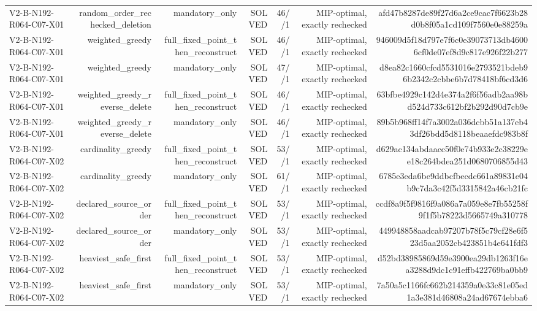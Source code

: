 {\begin{longtable}{lrrrrrr}
V2-B-N192-R064-C07-X01 & random\_order\_rechecked\_deletion & mandatory\_only & SOLVED & 46//1 & MIP-optimal, exactly rechecked & afd47b8287de89f27d6a2ce9cac7f6623b28d0b8f05a1cd109f7560e0e88259a \\
V2-B-N192-R064-C07-X01 & weighted\_greedy & full\_fixed\_point\_then\_reconstruct & SOLVED & 46//1 & MIP-optimal, exactly rechecked & 946009d5f18d797e7f6c0e39073713db46006cf0de07ef8d9c817e926f22b277 \\
V2-B-N192-R064-C07-X01 & weighted\_greedy & mandatory\_only & SOLVED & 47//1 & MIP-optimal, exactly rechecked & d8ea82c1660cfcd5531016e2793521bdeb96b2342c2cbbe6b7d78418bf6cd3d6 \\
V2-B-N192-R064-C07-X01 & weighted\_greedy\_reverse\_delete & full\_fixed\_point\_then\_reconstruct & SOLVED & 46//1 & MIP-optimal, exactly rechecked & 63bfbe4929c142d4e374a2f6f56adb2aa98bd524d733c612bf2b292d90d7cb9e \\
V2-B-N192-R064-C07-X01 & weighted\_greedy\_reverse\_delete & mandatory\_only & SOLVED & 46//1 & MIP-optimal, exactly rechecked & 89b5b968ff14f7a3002a036dcbb51a137eb43df26bdd5d8118beaaefdc983b8f \\
V2-B-N192-R064-C07-X02 & cardinality\_greedy & full\_fixed\_point\_then\_reconstruct & SOLVED & 53//1 & MIP-optimal, exactly rechecked & d629ac134abdaacc50f0e74b933e2c38229ee18c264bdea251d0680706855d43 \\
V2-B-N192-R064-C07-X02 & cardinality\_greedy & mandatory\_only & SOLVED & 61//1 & MIP-optimal, exactly rechecked & 6785e3eda6be9ddbcfbecdc661a89831e04b9c7da3c42f5d3315842a46cb21fc \\
V2-B-N192-R064-C07-X02 & declared\_source\_order & full\_fixed\_point\_then\_reconstruct & SOLVED & 53//1 & MIP-optimal, exactly rechecked & ccdf8a9f5f9816f9a086a7a059e8e7fb55258f9f1f5b78223d5665749a310778 \\
V2-B-N192-R064-C07-X02 & declared\_source\_order & mandatory\_only & SOLVED & 53//1 & MIP-optimal, exactly rechecked & 449948858aadcab97207b78f5c79cf28e6f523d5aa2052cb423851b4e641fdf3 \\
V2-B-N192-R064-C07-X02 & heaviest\_safe\_first & full\_fixed\_point\_then\_reconstruct & SOLVED & 53//1 & MIP-optimal, exactly rechecked & d52bd38985869d59e3900ea29db1263f16ea3288d9dc1c91effb422769ba0bb9 \\
V2-B-N192-R064-C07-X02 & heaviest\_safe\_first & mandatory\_only & SOLVED & 53//1 & MIP-optimal, exactly rechecked & 7a50a5c1166fc662b214359a0e33c81e05ed1a3e381d46808a24ad67674ebba6 \\

\end{longtable}}
